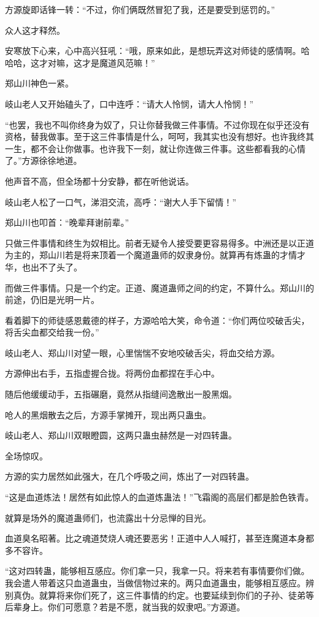 \begin{this_body}
方源旋即话锋一转：“不过，你们俩既然冒犯了我，还是要受到惩罚的。”

众人这才释然。

安寒放下心来，心中高兴狂吼：“哦，原来如此，是想玩弄这对师徒的感情啊。哈哈哈，这才对嘛，这才是魔道风范嘛！”

郑山川神色一紧。

岐山老人又开始磕头了，口中连呼：“请大人怜悯，请大人怜悯！”

“也罢，我也不叫你终身为奴了，只让你替我做三件事情。不过你现在似乎还没有资格，替我做事。至于这三件事情是什么，呵呵，我其实也没有想好。也许我终其一生，都不会让你做事。也许我下一刻，就让你连做三件事。这些都看我的心情了。”方源徐徐地道。

他声音不高，但全场都十分安静，都在听他说话。

岐山老人松了一口气，涕泪交流，高呼：“谢大人手下留情！”

郑山川也叩首：“晚辈拜谢前辈。”

只做三件事情和终生为奴相比。前者无疑令人接受要更容易得多。中洲还是以正道为主的，郑山川若是将来顶着一个魔道蛊师的奴隶身份。就算再有炼蛊的才情才华，也出不了头了。

而做三件事情。只是一个约定。正道、魔道蛊师之间的约定，不算什么。郑山川的前途，仍旧是光明一片。

看着脚下的师徒感恩戴德的样子，方源哈哈大笑，命令道：“你们两位咬破舌尖，将舌尖血都交给我一份。”

岐山老人、郑山川对望一眼，心里惴惴不安地咬破舌尖，将血交给方源。

方源伸出右手，五指虚握合拢。将两份血都捏在手心中。

随后他缓缓动手，五指碾磨，竟然从指缝间逸散出一股黑烟。

呛人的黑烟散去之后，方源手掌摊开，现出两只蛊虫。

岐山老人、郑山川双眼瞪圆，这两只蛊虫赫然是一对四转蛊。

全场惊叹。

方源的实力居然如此强大，在几个呼吸之间，炼出了一对四转蛊。

“这是血道炼法！居然有如此惊人的血道炼蛊法！”飞霜阁的高层们都是脸色铁青。

就算是场外的魔道蛊师们，也流露出十分忌惮的目光。

血道臭名昭著。比之魂道焚烧人魂还要恶劣！正道中人人喊打，甚至连魔道本身都多不容许。

“这对四转蛊，能够相互感应。你们拿一只，我拿一只。将来若有事情要你们做。我会遣人带着这只血道蛊虫，当做信物过来的。两只血道蛊虫，能够相互感应。辨别真伪。就算将来你们死了，这三件事情的约定。也要延续到你们的子孙、徒弟等后辈身上。你们可愿意？若是不愿，就当我的奴隶吧。”方源道。


\end{this_body}
